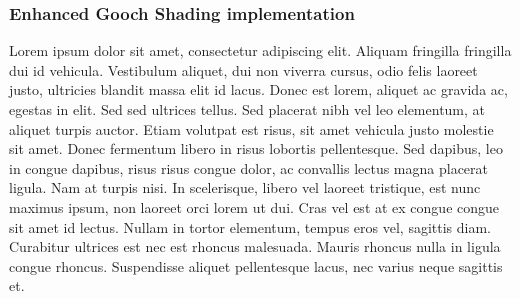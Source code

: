 \subsubsection{Enhanced Gooch Shading implementation}
Lorem ipsum dolor sit amet, consectetur adipiscing elit. Aliquam fringilla fringilla dui id vehicula. Vestibulum aliquet, dui non viverra cursus, odio felis laoreet justo, ultricies blandit massa elit id lacus. Donec est lorem, aliquet ac gravida ac, egestas in elit. Sed sed ultrices tellus. Sed placerat nibh vel leo elementum, at aliquet turpis auctor. Etiam volutpat est risus, sit amet vehicula justo molestie sit amet. Donec fermentum libero in risus lobortis pellentesque. Sed dapibus, leo in congue dapibus, risus risus congue dolor, ac convallis lectus magna placerat ligula. Nam at turpis nisi. In scelerisque, libero vel laoreet tristique, est nunc maximus ipsum, non laoreet orci lorem ut dui. Cras vel est at ex congue congue sit amet id lectus. Nullam in tortor elementum, tempus eros vel, sagittis diam. Curabitur ultrices est nec est rhoncus malesuada. Mauris rhoncus nulla in ligula congue rhoncus. Suspendisse aliquet pellentesque lacus, nec varius neque sagittis et.
